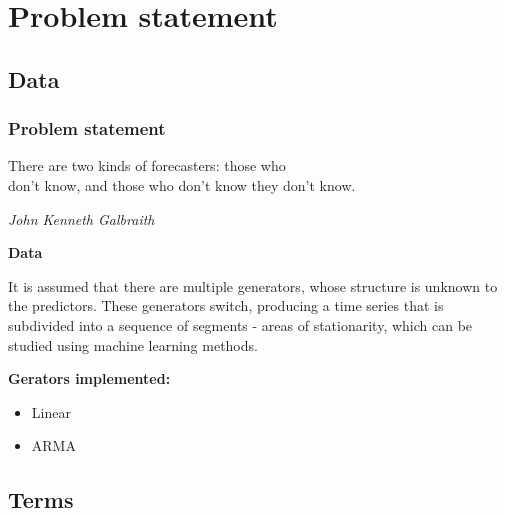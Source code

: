 \section{Problem statement} 
\subsection{Data} 

\begin{frame}
\frametitle{Problem statement}

\epigraph{There are two kinds of forecasters: those who \\ don’t know, and those who don’t know they don’t know.}{\textit{John Kenneth Galbraith}}

\textbf{Data}

It is assumed that there are multiple generators, whose structure is unknown to the predictors. These generators switch, producing a time series that is subdivided into a sequence of segments - areas of stationarity, which can be studied using machine learning methods. 

\bigskip
\textbf{Gerators implemented:}
\begin{itemize}
\item Linear 
\item ARMA
\end{itemize}




\end{frame}


\subsection{Terms} 

